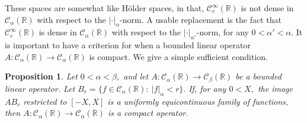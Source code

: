 \documentclass[11pt]{article}
\newcommand\cC{\mathcal{C}}
\newcommand\bbR{\mathbb R}
\newtheorem{proposition}{Proposition}
\theoremstyle{definition}
\theoremstyle{remark}
\begin{document}
   These spaces are somewhat like H\"older spaces, in that, 
   $\cC^{\infty}_{c}(\bbR)$ is not dense in $\cC_{\alpha}(\bbR)$ with respect to
   the $|\cdot|_{\alpha}$-norm. A usable replacement is the fact that
   $\cC^{\infty}_{c}(\bbR)$ is dense in $\cC_{\alpha}(\bbR)$ with respect to the
   $|\cdot|_{\alpha'}$-norm, for any $0<\alpha'<\alpha.$ It is important to have
   a criterion for when a bounded linear operator $A:\cC_{\alpha}(\bbR)\to \cC_{\alpha}(\bbR)$
   is compact. We give a simple sufficient condition.
   \begin{proposition}\label{prop3.97}
     Let $0<\alpha<\beta,$ and let $A:\cC_{\alpha}(\bbR)\to \cC_{\beta}(\bbR)$
     be a bounded linear operator. Let
     $B_r=\{f\in\cC_{\alpha}(\bbR):\:|f|_{\alpha}<r\}.$ If, for any $0<X,$ the
     image $AB_r$ restricted to $[-X,X]$ is a uniformly equicontinuous family of
     functions, then $A:\cC_{\alpha}(\bbR)\to \cC_{\alpha}(\bbR)$ is a compact
     operator.
   \end{proposition}
\end{document}
